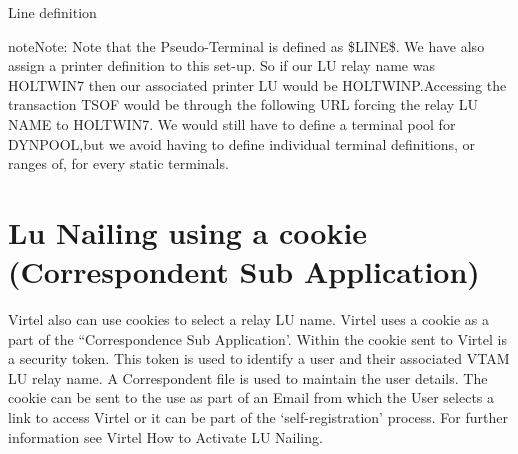 \documentclass[letterpaper,10pt,english]{sphinxmanual}
\begin{document}
Line definition






\begin{sphinxadmonition}{note}{Note:}
Note that the Pseudo-Terminal is defined as \$LINE\$. We have also assign a printer definition to this set-up. So if our LU relay name was HOLTWIN7 then our associated printer LU would be HOLTWINP.Accessing the transaction TSOF would be through the following URL forcing the relay LU NAME to HOLTWIN7. We would still have to define a terminal pool for DYNPOOL,but we avoid having to define individual terminal definitions, or ranges of, for every static terminals.
\end{sphinxadmonition}


\ignorespaces 

\section{Lu Nailing using a cookie (Correspondent Sub Application)}
\label{\detokenize{Customization:lu-nailing-using-a-cookie-correspondent-sub-application}}\label{\detokenize{Customization:index-59}}
Virtel also can use cookies to select a relay LU name. Virtel uses a cookie as a part of the “Correspondence Sub Application’. Within the cookie sent to Virtel is a security token. This token is used to identify a user and their associated VTAM LU relay name. A Correspondent file is used to maintain the user details. The cookie can be sent to the use as part of an Email from which the User selects a link to access Virtel or it can be part of the ‘self-registration’ process. For further information see Virtel \textendash{} How to Activate LU Nailing.

\ignorespaces 
\end{document}
